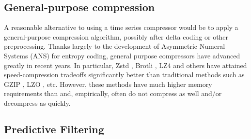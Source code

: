 
\subsection{General-purpose compression}
A reasonable alternative to using a time series compressor would be to apply a general-purpose compression algorithm, possibly after delta coding or other preprocessing. Thanks largely to the development of Asymmetric Numeral Systems (ANS) \cite{ans} for entropy coding, general purpose compressors have advanced greatly in recent years. In particular, Zstd \cite{zstd}, Brotli \cite{brotli}, LZ4 \cite{lz4} and others have attained speed-compression tradeoffs significantly better than traditional methods such as GZIP \cite{gzip}, LZO \cite{lzo}, etc. However, these methods have much higher memory requirements than \minesp and, empirically, often do not compress as well and/or decompress as quickly.


\subsection{Predictive Filtering}



